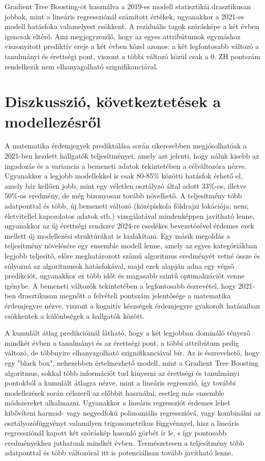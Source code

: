 \documentclass[12pt]{article}
\begin{document}
\noindent Gradient Tree Boosting-ot használva a 2019-es modell statisztikái drasztikusan jobbak, mint a lineáris regressziónál számított értékek, ugyanakkor a 2021-es modell hatásfoka valamelyest csökkent. A reziduális tagok szórásképe a két évben igencsak eltérő. Ami megjegyzendő, hogy az egyes attribútumok egymáshoz viszonyított prediktív ereje a két évben közel azonos: a két legfontosabb változó a tanulmányi és érettségi pont, viszont a többi változó közül csak a 0. ZH pontszám rendelkezik nem elhanyagolható szignifikanciával.

\newpage 

\section{Diszkusszió, következtetések a modellezésről}

A matematika érdemjegyek prediktálása során sikeresebben megjósolhatóak a 2021-ben kezdett hallgatók teljesítményei, amely azt jelenti, hogy náluk kisebb az ingadozás és a variancia a bemeneti adatok tekintetében a célváltozóra nézve. Ugyanakkor a legjobb modellekkel is csak 80-85\% közötti hatásfok érhető el, amely bár kellően jobb, mint egy véletlen osztályzó által adott 33\%-os, illetve 50\%-os eredmény, de még bizonyosan tovább növelhető. A teljesítmény több adatponttal és több, új bemeneti változó (középiskola földrajzi lokációja; nem; életvitellel kapcsolatos adatok stb.) vizsgálatával mindenképpen javítható lenne, ugyanakkor az új érettségi rendszer 2024-re esedékes bevezetésével érdemes ezek mellett új modellezési struktúrákat is kialakítani. Egy másik megoldás a teljesítmény növelésére egy ensemble modell lenne, amely az egyes kategóriákban legjobb teljesítő, előre meghatározott számú algoritmus eredményét vetné össze és súlyozná az algoritmusok hatásfokával, majd ezek alapján adna egy végső predikciót, ugyanakkor ez több időt és magasabb szintű optimalizációt venne igénybe. A bemeneti változók tekintetében a legfontosabb észrevétel, hogy 2021-ben drasztikusan megnőtt a felvételi pontszám jelentősége a matematika érdemjegyre nézve, viszont a kognitív készségek érdemjegyre gyakorolt hatásaiban csökkentek a különbségek a hallgatók között.

A kumulált átlag predikcióinál látható, hogy a két legjobban domináló tényező mindkét évben a tanulmányi és az érettségi pont, a többi attribútum pedig változó, de többnyire elhanyagolható szignifikanciával bír. Az is észrevehető, hogy egy "black box", nehezebben értelmezhető modell, mint a Gradient Tree Boosting algoritmus, sokkal több információt tud kinyerni az érettségi és tanulmányi pontokból a kumulált átlagra nézve, mint a lineáris regresszió, így további modellezések során célszerű az előbbit használni, esetleg más ensemble módszereket alkalmazni. Ugyanakkor a lineáris regressziót érdemes lehet kibővíteni harmad- vagy negyedfokú polinomiális regresszióvá, vagy kombinálni az osztályozófüggvényt valamilyen trigonometrikus függvénnyel, hisz a lineáris regressziónál kapott két szóráskép hasonló görbét ír le, s így pontosabb eredményekhez juthatunk mindkét évben. Természetesen a teljesítmény több adatponttal és több változóval itt is potenciálisan tovább javítható lenne. 
\end{document}
